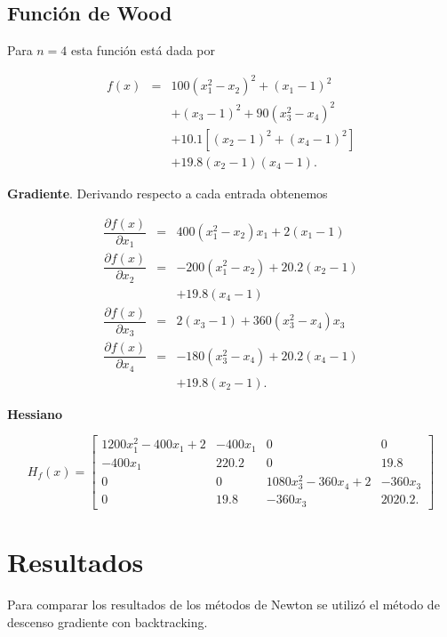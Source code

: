 \documentclass[11pt,letterpaper]{article}
\theoremstyle{definition}
\theoremstyle{definition}
\theoremstyle{definition}
\begin{document}
\subsection{Función de Wood}
Para $ n = 4 $ esta función está dada por
\begin{shaded*}
	\begin{eqnarray*}
		f(x) & = & 100 (x_1^2 - x_2)^2 + (x_1 - 1)^2 \\
			 &   & + (x_3 - 1)^2 + 90 (x_3^2 - x_4)^2 \\
		  	 &   & + 10.1 [ (x_2 -1)^2 + (x_4 -1)^2 ] \\
		  	 &   & + 19.8 (x_2 -1) (x_4 -1).
	\end{eqnarray*}
\end{shaded*}
\textbf{Gradiente}. Derivando respecto a cada entrada obtenemos
\begin{shaded*}
\begin{eqnarray*}
	\dfrac{\partial f(x)}{\partial x_1} & = & 400(x_1^2 - x_2) x_1 + 2(x_1 - 1) \\
	\dfrac{\partial f(x)}{\partial x_2} & = &-200(x_1^2 - x_2) + 20.2 (x_2 - 1) \\
										&   & + 19.8 (x_4 - 1) \\
	\dfrac{\partial f(x)}{\partial x_3} & = & 2(x_3 - 1) + 360 (x_3^2 - x_4) x_3 \\
	\dfrac{\partial f(x)}{\partial x_4} & = & -180 (x_3^2 - x_4)+ 20.2 (x_4 - 1)  \\
										&   & +19.8(x_2 -1).
\end{eqnarray*}
\end{shaded*}
\textbf{Hessiano}
\begin{shaded*}
\tiny{\begin{equation*}
	H_f (x) = \left[\begin{matrix}
					1200 x_1^2 - 400 x_1 + 2 & -400 x_1 & 0 & 0 \\
					-400 x_1                 & 220.2    & 0 & 19.8 \\
					0                        & 0        & 1080x_3^2 - 360x_4 + 2 & -360x_3 \\
					0 & 19.8 & -360 x_3 & 2020.2. 
					 
	\end{matrix}\right]
\end{equation*}}
\end{shaded*}
\section{Resultados}
Para comparar los resultados de los métodos de Newton se utilizó el método de descenso gradiente con backtracking. 
\end{document}
